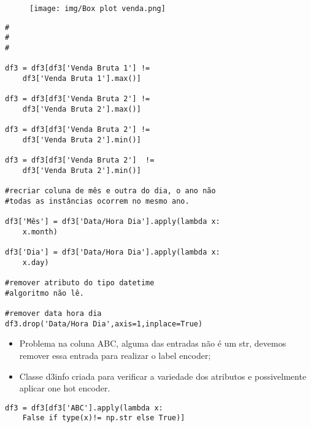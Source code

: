 \documentclass[compress]{beamer}
\begin{document}
\begin{frame}{}
    \begin{figure}
        \centering
        \texttt{[image: img/Box plot venda.png]}
    \end{figure}
\end{frame}

\begin{verbatim}
#
#
#

df3 = df3[df3['Venda Bruta 1'] !=
    df3['Venda Bruta 1'].max()]
    
df3 = df3[df3['Venda Bruta 2'] !=
    df3['Venda Bruta 2'].max()]
    
df3 = df3[df3['Venda Bruta 2'] !=
    df3['Venda Bruta 2'].min()]
    
df3 = df3[df3['Venda Bruta 2']  !=
    df3['Venda Bruta 2'].min()]
    
#recriar coluna de mês e outra do dia, o ano não
#todas as instâncias ocorrem no mesmo ano.

df3['Mês'] = df3['Data/Hora Dia'].apply(lambda x:
    x.month)

df3['Dia'] = df3['Data/Hora Dia'].apply(lambda x:
    x.day)

#remover atributo do tipo datetime
#algoritmo não lê.

#remover data hora dia
df3.drop('Data/Hora Dia',axis=1,inplace=True)    

\end{verbatim}


\begin{frame}{}
    \begin{itemize}
        \item Problema na coluna ABC, alguma das entradas não é um str, devemos remover essa entrada para realizar o label encoder;
        \item Classe d3info criada para verificar a variedade dos atributos e possivelmente aplicar one hot encoder.
    \end{itemize}
\end{frame}

\begin{verbatim}
df3 = df3[df3['ABC'].apply(lambda x:
    False if type(x)!= np.str else True)]
    
df3info.tipo_venda
df3info.Produto_1
df3info.Produto_2

#tipo_venda possui 4 categorias, os outros mais de 4.
\end{verbatim}
\end{document}
